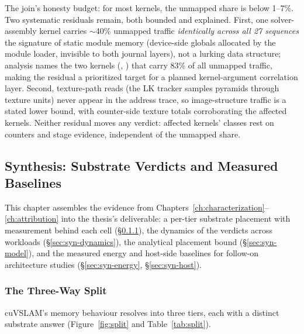 The join’s honesty budget: for most kernels, the unmapped share is below 1--7\%. Two systematic residuals remain, both bounded and explained. First, one solver-assembly kernel carries $\sim$40\% unmapped traffic \emph{identically across all 27 sequences} the signature of static module memory (device-side globals allocated by the module loader, invisible to both journal layers), not a lurking data structure; analysis names the two kernels (, ) that carry 83\% of all unmapped traffic, making the residual a prioritized target for a planned kernel-argument correlation layer. Second, texture-path reads (the LK tracker samples pyramids through texture units) never appear in the address trace, so image-structure traffic is a stated lower bound, with counter-side texture totals corroborating the affected kernels. Neither residual moves any verdict: affected kernels' classes rest on counters and stage evidence, independent of the unmapped share.

\subsection{Synthesis: Substrate Verdicts and Measured Baselines}
\label{ch:synthesis}

This chapter assembles the evidence from Chapters~\ref{ch:characterization}--\ref{ch:attribution} into the thesis's deliverable: a per-tier substrate placement with measurement behind each cell (\S\ref{sec:syn-split}), the dynamics of the verdicts across workloads (\S\ref{sec:syn-dynamics}), the analytical placement bound (\S\ref{sec:syn-model}), and the measured energy and host-side baselines for follow-on architecture studies (\S\ref{sec:syn-energy}, \S\ref{sec:syn-host}).

\subsubsection{The Three-Way Split}
\label{sec:syn-split}

cuVSLAM's memory behaviour resolves into three tiers, each with a distinct substrate answer (Figure~\ref{fig:split} and Table~\ref{tab:split}).

